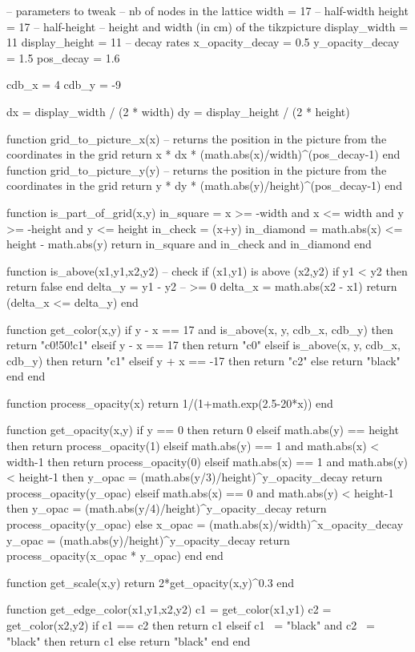 \begin{luacode}
-- parameters to tweak
-- nb of nodes in the lattice
width = 17 -- half-width
height = 17 -- half-height
-- height and width (in cm) of the tikzpicture
display_width = 11
display_height = 11
-- decay rates 
x_opacity_decay = 0.5
y_opacity_decay = 1.5
pos_decay = 1.6

cdb_x = 4
cdb_y = -9

dx = display_width / (2 * width)
dy = display_height / (2 * height)

function grid_to_picture_x(x)
	-- returns the position in the picture from the coordinates in the grid
	return x * dx * (math.abs(x)/width)^(pos_decay-1)
end 
function grid_to_picture_y(y)
	-- returns the position in the picture from the coordinates in the grid
	return y * dy * (math.abs(y)/height)^(pos_decay-1)
end

function is_part_of_grid(x,y)
	in_square = x >= -width and x <= width and y >= -height and y <= height
	in_check = (x+y)%
	in_diamond = math.abs(x) <= height - math.abs(y)
	return in_square and in_check and in_diamond
end

function is_above(x1,y1,x2,y2) -- check if (x1,y1) is above (x2,y2)
	if y1 < y2 then
		return false
	end
	delta_y = y1 - y2 -- >= 0
	delta_x = math.abs(x2 - x1)
	return (delta_x <= delta_y)
end

function get_color(x,y)
	if y - x == 17 and is_above(x, y, cdb_x, cdb_y) then
		return "c0!50!c1"
	elseif y - x == 17 then
		return "c0"
	elseif is_above(x, y, cdb_x, cdb_y) then
		return "c1"
	elseif y + x == -17 then
		return "c2"
	else
		return "black" 
	end
end

function process_opacity(x)
	return 1/(1+math.exp(2.5-20*x))
end

function get_opacity(x,y)
	if y == 0 then
		return 0
	elseif math.abs(y) == height then
		return process_opacity(1)
	elseif math.abs(y) == 1 and math.abs(x) < width-1 then
		return process_opacity(0)
	elseif math.abs(x) == 1 and math.abs(y) < height-1 then
		y_opac = (math.abs(y/3)/height)^y_opacity_decay
		return process_opacity(y_opac)
	elseif math.abs(x) == 0 and math.abs(y) < height-1 then
		y_opac = (math.abs(y/4)/height)^y_opacity_decay
		return process_opacity(y_opac)
	else
		x_opac = (math.abs(x)/width)^x_opacity_decay
		y_opac = (math.abs(y)/height)^y_opacity_decay
		return process_opacity(x_opac * y_opac)
	end
end

function get_scale(x,y)
	return 2*get_opacity(x,y)^0.3
end

function get_edge_color(x1,y1,x2,y2)
	c1 = get_color(x1,y1)
	c2 = get_color(x2,y2)
	if c1 == c2 then
		return c1
	elseif c1 ~= "black" and c2 ~= "black" then
		return c1
	else
		return "black"
	end
end


\end{luacode}
